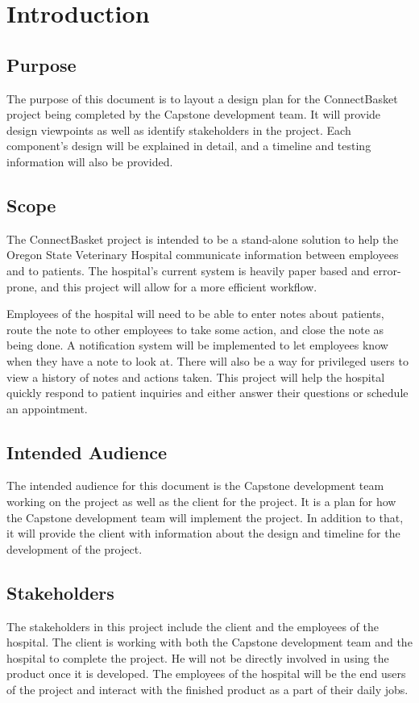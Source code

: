 \documentclass[onecolumn, draftclsnofoot,10pt, compsoc]{IEEEtran}
\begin{document}
\section{Introduction}

\subsection{Purpose}
The purpose of this document is to layout a design plan for the ConnectBasket project being completed by the Capstone development team. It will provide design viewpoints as well as identify stakeholders in the project. Each component's design will be explained in detail, and a timeline and testing information will also be provided.
\subsection{Scope}
The ConnectBasket project is intended to be a stand-alone solution to help the Oregon State Veterinary Hospital communicate information between employees and to patients. The hospital's current system is heavily paper based and error-prone, and this project will allow for a more efficient workflow.

Employees of the hospital will need to be able to enter notes about patients, route the note to other employees to take some action, and close the note as being done. A notification system will be implemented to let employees know when they have a note to look at. There will also be a way for privileged users to view a history of notes and actions taken. This project will help the hospital quickly respond to patient inquiries and either answer their questions or schedule an appointment.

\subsection{Intended Audience}
The intended audience for this document is the Capstone development team working on the project as well as the client for the project. It is a plan for how the Capstone development team will implement the project. In addition to that, it will provide the client with information about the design and timeline for the development of the project.

\subsection{Stakeholders}
The stakeholders in this project include the client and the employees of the hospital. The client is working with both the Capstone development team and the hospital to complete the project. He will not be directly involved in using the product once it is developed. The employees of the hospital will be the end users of the project and interact with the finished product as a part of their daily jobs.
\end{document}
